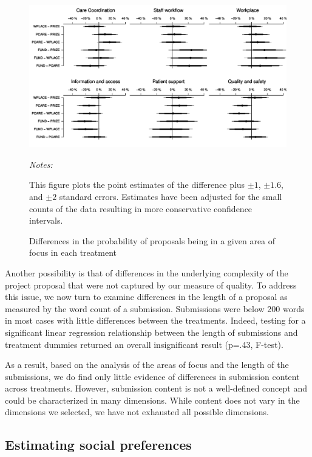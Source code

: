 \documentclass[11pt, titlepage]{article}
\newenvironment{tablenotes}[1][]{
  \begin{minipage}{\textwidth}\emph{Notes:}{\footnotesize #1}
}{\end{minipage}}
\begin{document}
\begin{figure}
  \centering
  \caption{Differences in the probability of proposals being in a given area of focus in each treatment}
  \label{fig: areas of focus}
  \includegraphics{figures/areas-1.pdf}
  \begin{tablenotes}
  This figure plots the point estimates of the difference plus $\pm 1$, $\pm 1.6$, and $\pm 2$ standard errors. Estimates have been adjusted for the small counts of the data \citep{agresti2000simple} resulting in more conservative confidence intervals.
  \end{tablenotes}
\end{figure}

Another possibility is that of differences in the underlying complexity
of the project proposal that were not captured by our measure of
quality. To address this issue, we now turn to examine differences in
the length of a proposal as measured by the word count of a submission.
Submissions were below 200 words in most cases with little differences
between the treatments. Indeed, testing for a significant linear
regression relationship between the length of submissions and treatment
dummies returned an overall insignificant result (p=.43, F-test).

As a result, based on the analysis of the areas of focus and the length
of the submissions, we do find only little evidence of differences in
submission content across treatments. However, submission content is not
a well-defined concept and could be characterized in many dimensions.
While content does not vary in the dimensions we selected, we have not
exhausted all possible dimensions.

\subsection{Estimating social
preferences}\label{estimating-social-preferences}
\end{document}
